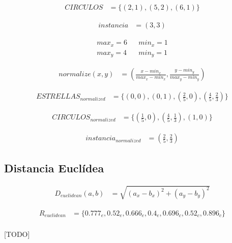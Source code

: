 \documentclass{article}
\begin{document}
		\begin{align}
		\label{eq:circulos}
			CIRCULOS &= \{(2,1), (5,2), (6,1)\}
		\end{align}

		\begin{align}
		\label{eq:instancia}
			instancia &= (3,3)
		\end{align}


		\begin{align}
			max_x = 6 && min_x = 1 \\
			max_y = 4 && min_y = 1
		\end{align}

		\begin{align}
		\label{eq:normalization}
			normalize(x,y) &= (\frac{x-min_x}{max_x-min_x},\frac{y-min_y}{max_y-min_y})
		\end{align}


		\begin{align}
		\label{eq:estrellas_normalized}
			ESTRELLAS_{normalized} &= \{(0,0), (0,1), (\tfrac{2}{5},0), (\tfrac{4}{5},\tfrac{2}{3})\}
		\end{align}

		\begin{align}
		\label{eq:circulos_normalized}
			CIRCULOS_{normalized}  &= \{(\tfrac{1}{5},0), (\tfrac{4}{5},\tfrac{1}{3}), (1,0)\}
		\end{align}

		\begin{align}
		\label{eq:instancia_normalized}
			instancia_{normalized}  &= (\tfrac{2}{5},\tfrac{2}{3})
		\end{align}

		\subsection{Distancia Euclídea}


			\begin{align}
				D_{euclidean}(a,b) &= \sqrt{(a_x - b_x)^2 + (a_y - b_y)^2}
			\end{align}

			\begin{align}
				R_{euclidean} &= \{0.777_e, 0.52_e, 0.666_e, 0.4_e, 0.696_c, 0.52_c, 0.896_c\}
			\end{align}

			\paragraph{}
			[TODO]
\end{document}
